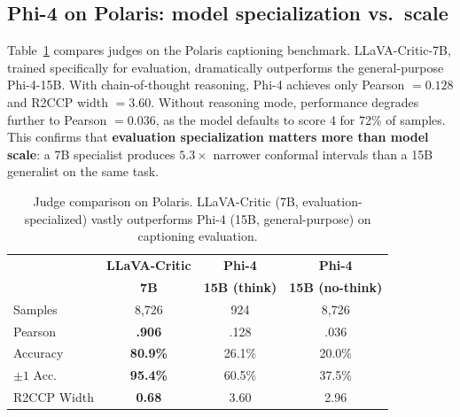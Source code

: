 \documentclass{article}
\begin{document}
\subsection{Phi-4 on Polaris: model specialization vs.\ scale}
\label{app:phi4_polaris}

Table~\ref{tab:phi4_polaris} compares judges on the Polaris captioning benchmark. LLaVA-Critic-7B, trained specifically for evaluation, dramatically outperforms the general-purpose Phi-4-15B. With chain-of-thought reasoning, Phi-4 achieves only Pearson $= 0.128$ and R2CCP width $= 3.60$. Without reasoning mode, performance degrades further to Pearson $= 0.036$, as the model defaults to score 4 for 72\% of samples. This confirms that \textbf{evaluation specialization matters more than model scale}: a 7B specialist produces $5.3\times$ narrower conformal intervals than a 15B generalist on the same task.

\begin{table}[t]
\centering
\caption{Judge comparison on Polaris. LLaVA-Critic (7B, evaluation-specialized) vastly outperforms Phi-4 (15B, general-purpose) on captioning evaluation.}
\label{tab:phi4_polaris}
\small
\begin{tabular}{lccc}
\toprule
& \textbf{LLaVA-Critic} & \textbf{Phi-4} & \textbf{Phi-4} \\
& \textbf{7B} & \textbf{15B (think)} & \textbf{15B (no-think)} \\
\midrule
Samples & 8,726 & 924 & 8,726 \\
Pearson & \textbf{.906} & .128 & .036 \\
Accuracy & \textbf{80.9\%} & 26.1\% & 20.0\% \\
$\pm 1$ Acc. & \textbf{95.4\%} & 60.5\% & 37.5\% \\
R2CCP Width & \textbf{0.68} & 3.60 & 2.96 \\
\bottomrule
\end{tabular}
\end{table}
\end{document}
